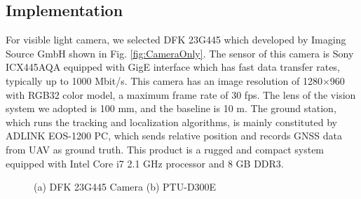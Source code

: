 \subsection{Implementation}


%



For visible light camera, we selected DFK 23G445 which developed by Imaging Source GmbH shown in Fig. \ref{fig:CameraOnly}. The sensor of this camera is Sony ICX445AQA equipped with GigE interface which has fast data transfer rates, typically up to 1000 Mbit/s. This camera has an image resolution of 1280$\times$960 with RGB32 color model, a maximum frame rate of 30 fps. The lens of the vision system we adopted is 100 mm, and the baseline is 10 m. The ground station, which runs the tracking and localization algorithms, is mainly constituted by ADLINK EOS-1200 PC, which sends relative position and records GNSS data from UAV as ground truth.  This product is a rugged and compact system equipped with Intel Core i7 2.1 GHz processor and 8 GB DDR3. 


\begin{figure}[!tb]
	\centering
	\caption{(a) DFK 23G445 Camera (b) PTU-D300E}
\end{figure}

